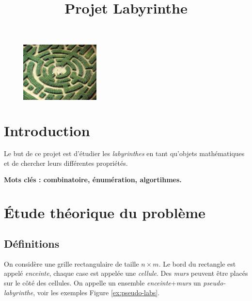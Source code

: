 \documentclass{../ficheTDTP}
\title{Projet Labyrinthe}
\begin{document}
\maketitle

\begin{figure}[h]
\vspace{-5mm}
	\begin{center}
            \includegraphics[width=4cm]{labyrinthe.jpg}
        \end{center}
	
\end{figure}


\section*{Introduction}

Le but de ce projet est d'étudier les \emph{labyrinthes} en tant qu'objets mathématiques et de chercher leurs différentes propriétés.

\textbf{Mots clés : combinatoire, énumération, algortihmes.}



\section{\'Etude théorique du problème}

\subsection{Définitions}

On considère une grille rectangulaire de taille $n \times m$. Le bord du rectangle est appelé \emph{enceinte}, chaque case est appelée une \emph{cellule}. Des \emph{murs} peuvent être placés sur le côté des cellules. On appelle un ensemble \emph{enceinte}+\emph{murs} un \emph{pseudo-labyrinthe}, voir les exemples Figure \ref{ex:pseudo-labs}.
\end{document}
